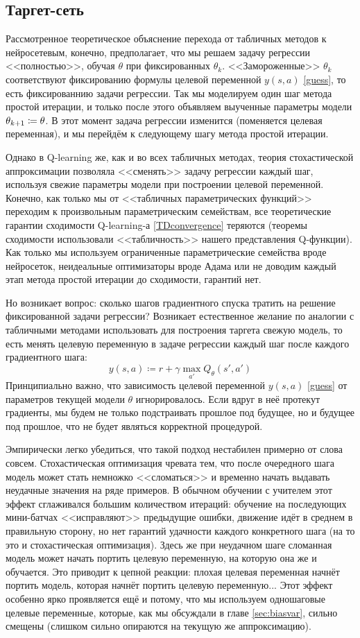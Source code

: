\subsection{Таргет-сеть}

Рассмотренное теоретическое объяснение перехода от табличных методов к нейросетевым, конечно, предполагает, что мы решаем задачу регрессии <<полностью>>, обучая $\theta$ при фиксированных $\theta_k$. <<Замороженные>> $\theta_k$ соответствуют фиксированию формулы целевой переменной $y(s, a)$ \eqref{guess}, то есть фиксированнию задачи регрессии. Так мы моделируем один шаг метода простой итерации, и только после этого объявляем выученные параметры модели $\theta_{k+1} \HM\coloneqq \theta$. В этот момент задача регрессии изменится (поменяется целевая переменная), и мы перейдём к следующему шагу метода простой итерации. 

Однако в Q-learning же, как и во всех табличных методах, теория стохастической аппроксимации позволяла <<сменять>> задачу регрессии каждый шаг, используя свежие параметры модели при построении целевой переменной. Конечно, как только мы от <<табличных параметрических функций>> переходим к произвольным параметрическим семействам, все теоретические гарантии сходимости Q-learning-а \ref{TDconvergence} теряются (теоремы сходимости использовали <<табличность>> нашего представления Q-функции). Как только мы используем ограниченные параметрические семейства вроде нейросеток, неидеальные оптимизаторы вроде Адама или не доводим каждый этап метода простой итерации до сходимости, гарантий нет.

Но возникает вопрос: сколько шагов градиентного спуска тратить на решение фиксированной задачи регрессии? Возникает естественное желание по аналогии с табличными методами использовать для построения таргета свежую модель, то есть менять целевую переменную в задаче регрессии каждый шаг после каждого градиентного шага:
$$y(s, a) \coloneqq r + \gamma \max_{a'} Q_{\theta}(s', a')$$
Принципиально важно, что зависимость целевой переменной $y(s, a)$ \eqref{guess} от параметров текущей модели $\theta$ игнорировалось. Если вдруг в неё протекут градиенты, мы будем не только подстраивать прошлое под будущее, но и будущее под прошлое, что не будет являться корректной процедурой. 

Эмпирически легко убедиться, что такой подход нестабилен примерно от слова совсем. Стохастическая оптимизация чревата тем, что после очередного шага модель может стать немножко <<сломаться>> и временно начать выдавать неудачные значения на ряде примеров. В обычном обучении с учителем этот эффект сглаживался большим количеством итераций: обучение на последующих мини-батчах <<исправляют>> предыдущие ошибки, движение идёт в среднем в правильную сторону, но нет гарантий удачности каждого конкретного шага (на то это и стохастическая оптимизация). Здесь же при неудачном шаге сломанная модель может начать портить целевую переменную, на которую она же и обучается. Это приводит к цепной реакции: плохая целевая переменная начнёт портить модель, которая начнёт портить целевую переменную... Этот эффект особенно ярко проявляется ещё и потому, что мы используем одношаговые целевые переменные, которые, как мы обсуждали в главе \ref{sec:biasvar}, сильно смещены (слишком сильно опираются на текущую же аппроксимацию).

